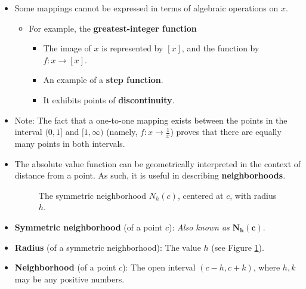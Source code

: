 \documentclass[../main.tex]{subfiles}
\begin{document}
\begin{itemize}
\begin{itemize}
    \end{itemize}
    \item Some mappings cannot be expressed in terms of algebraic operations on $x$.
    \begin{itemize}
        \item For example, the \textbf{greatest-integer function} 
        \begin{itemize}
            \item The image of $x$ is represented by $[x]$, and the function by $f:x\to[x]$.
            \item An example of a \textbf{step function}.
            \item It exhibits points of \textbf{discontinuity}.
        \end{itemize}
    \end{itemize}
    \item Note: The fact that a one-to-one mapping exists between the points in the interval $(0,1]$ and $[1,\infty)$ (namely, $f:x\to\frac{1}{x}$) proves that there are equally many points in both intervals.
    \item The absolute value function can be geometrically interpreted in the context of distance from a point. As such, it is useful in describing \textbf{neighborhoods}.
    \begin{figure}[h!]
        \centering
        \caption{The symmetric neighborhood $N_h(c)$, centered at $c$, with radius $h$.}
        \label{fig:neighborhood+radius}
    \end{figure}
    \item \textbf{Symmetric neighborhood} (of a point $c$):  \emph{Also known as} $\bm{N_h(c)}$.
    \item \textbf{Radius} (of a symmetric neighborhood): The value $h$ (see Figure \ref{fig:neighborhood+radius}).
    \item \textbf{Neighborhood} (of a point $c$): The open interval $(c-h,c+k)$, where $h,k$ may be any positive numbers.

\end{itemize}
\end{document}
